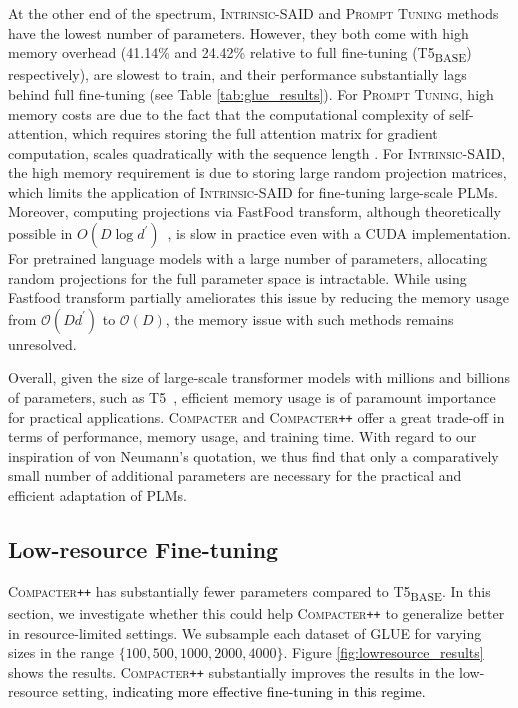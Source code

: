 At the other end of the spectrum, \textsc{Intrinsic-SAID} and \textsc{Prompt Tuning} methods have the lowest number of parameters. However, they both come with high memory overhead (41.14\% and 24.42\% relative to full fine-tuning (T5\textsubscript{\tiny BASE}) respectively), are slowest to train, and their performance substantially lags behind full fine-tuning (see Table \ref{tab:glue_results}). For \textsc{Prompt Tuning}, high memory costs are due to the fact that the computational complexity of self-attention, which requires storing the full attention matrix for gradient computation, scales quadratically with the sequence length \cite{wang2020linformer}. For  \textsc{Intrinsic-SAID}, the high memory requirement is due to storing large random projection matrices, which limits the application of \textsc{Intrinsic-SAID} for fine-tuning large-scale PLMs. Moreover, computing projections via FastFood transform, although theoretically possible in $O(D \log d^{\prime})$~\citep{le2013fastfood}, is slow in practice even with a CUDA implementation. For pretrained language models with a large number of parameters, allocating random projections for the full parameter space is intractable. While using Fastfood transform partially ameliorates this issue by reducing the memory usage from $\mathcal{O}(Dd^{\prime})$ to $\mathcal{O}(D)$, the memory issue with such methods remains unresolved.

Overall, given the size of large-scale transformer models with millions and billions of parameters, such as T5~\citep{raffel2019exploring}, efficient memory usage is of paramount importance for practical applications. \textsc{Compacter} and \textsc{Compacter}\texttt{++} offer a great trade-off in terms of performance, memory usage, and training time. With regard to our inspiration of von Neumann's quotation, we thus find that only a comparatively small number of additional parameters are necessary for the practical and efficient adaptation of PLMs.

\subsection{Low-resource Fine-tuning} \label{sec:low_resource}
\textsc{Compacter}\texttt{++} has substantially fewer parameters compared to T5\textsubscript{\tiny BASE}. In this section, we investigate whether this could help \textsc{Compacter}\texttt{++} to generalize better in resource-limited settings. We subsample each dataset of GLUE for varying sizes in the range $\{100, 500, 1000, 2000, 4000\}$. Figure \ref{fig:lowresource_results} shows the results. \textsc{Compacter}\texttt{++} substantially improves the results in the low-resource setting, \textcolor{black}{indicating more effective fine-tuning in this regime.} 

